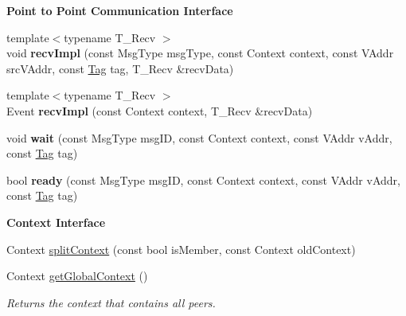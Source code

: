 \begin{Indent}{\bf Point to Point Communication Interface}
\begin{DoxyCompactItemize}
\item 
\hypertarget{structgraybat_1_1communicationPolicy_1_1ZMQ_aca65dd2ffd1049f72e194c13968b846c}{}{\footnotesize template$<$typename T\+\_\+\+Recv $>$ }\\void {\bfseries recv\+Impl} (const Msg\+Type msg\+Type, const Context context, const V\+Addr src\+V\+Addr, const \hyperlink{structTag}{Tag} tag, T\+\_\+\+Recv \&recv\+Data)\label{structgraybat_1_1communicationPolicy_1_1ZMQ_aca65dd2ffd1049f72e194c13968b846c}

\item 
\hypertarget{structgraybat_1_1communicationPolicy_1_1ZMQ_a0c112e35dba53faa1ee222dc722eb20e}{}{\footnotesize template$<$typename T\+\_\+\+Recv $>$ }\\Event {\bfseries recv\+Impl} (const Context context, T\+\_\+\+Recv \&recv\+Data)\label{structgraybat_1_1communicationPolicy_1_1ZMQ_a0c112e35dba53faa1ee222dc722eb20e}

\item 
\hypertarget{structgraybat_1_1communicationPolicy_1_1ZMQ_aff4a73567456ebb5bf0a2a17bd8170fc}{}void {\bfseries wait} (const Msg\+Type msg\+I\+D, const Context context, const V\+Addr v\+Addr, const \hyperlink{structTag}{Tag} tag)\label{structgraybat_1_1communicationPolicy_1_1ZMQ_aff4a73567456ebb5bf0a2a17bd8170fc}

\item 
\hypertarget{structgraybat_1_1communicationPolicy_1_1ZMQ_acc3da7a5e16668628ae74161f6ab8e7b}{}bool {\bfseries ready} (const Msg\+Type msg\+I\+D, const Context context, const V\+Addr v\+Addr, const \hyperlink{structTag}{Tag} tag)\label{structgraybat_1_1communicationPolicy_1_1ZMQ_acc3da7a5e16668628ae74161f6ab8e7b}

\end{DoxyCompactItemize}
\end{Indent}
\begin{Indent}{\bf Context Interface}\par
\begin{DoxyCompactItemize}
\item 
Context \hyperlink{structgraybat_1_1communicationPolicy_1_1ZMQ_a6760648ce6f21fefad245292c46565f4}{split\+Context} (const bool is\+Member, const Context old\+Context)
\item 
\hypertarget{structgraybat_1_1communicationPolicy_1_1ZMQ_a8146abbd757a057ad24a929667a01ee6}{}Context \hyperlink{structgraybat_1_1communicationPolicy_1_1ZMQ_a8146abbd757a057ad24a929667a01ee6}{get\+Global\+Context} ()\label{structgraybat_1_1communicationPolicy_1_1ZMQ_a8146abbd757a057ad24a929667a01ee6}

\begin{DoxyCompactList}\small\item\em Returns the context that contains all peers. \end{DoxyCompactList}\end{DoxyCompactItemize}
\end{Indent}

